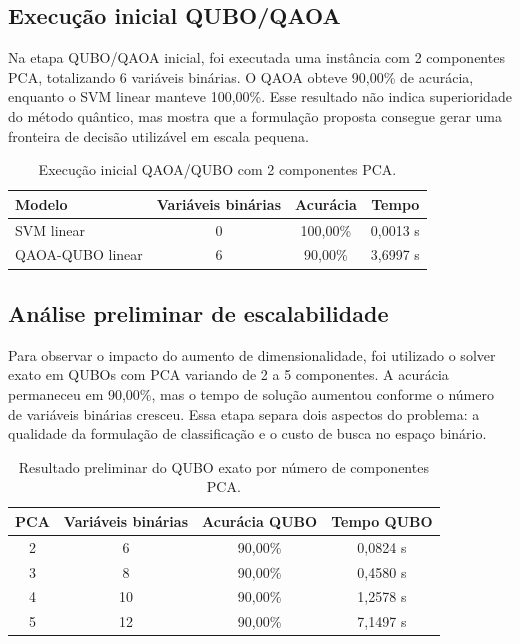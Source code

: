 \documentclass[12pt]{unisenaiclass}
\begin{document}
\subsection{Execução inicial QUBO/QAOA}

Na etapa QUBO/QAOA inicial, foi executada uma instância com 2 componentes PCA, totalizando 6 variáveis binárias. O QAOA obteve 90,00\% de acurácia, enquanto o SVM linear manteve 100,00\%. Esse resultado não indica superioridade do método quântico, mas mostra que a formulação proposta consegue gerar uma fronteira de decisão utilizável em escala pequena.

\begin{table}[H]
    \centering
    \caption{Execução inicial QAOA/QUBO com 2 componentes PCA.}
    \label{tab:qaoa-inicial}
    \begin{tabular}{lccc}
        \toprule
        Modelo & Variáveis binárias & Acurácia & Tempo \\
        \midrule
        SVM linear & 0 & 100,00\% & 0,0013 s \\
        QAOA-QUBO linear & 6 & 90,00\% & 3,6997 s \\
        \bottomrule
    \end{tabular}
\end{table}

\subsection{Análise preliminar de escalabilidade}

Para observar o impacto do aumento de dimensionalidade, foi utilizado o solver exato em QUBOs com PCA variando de 2 a 5 componentes. A acurácia permaneceu em 90,00\%, mas o tempo de solução aumentou conforme o número de variáveis binárias cresceu. Essa etapa separa dois aspectos do problema: a qualidade da formulação de classificação e o custo de busca no espaço binário.

\begin{table}[H]
    \centering
    \caption{Resultado preliminar do QUBO exato por número de componentes PCA.}
    \label{tab:qubo-exato}
    \begin{tabular}{cccc}
        \toprule
        PCA & Variáveis binárias & Acurácia QUBO & Tempo QUBO \\
        \midrule
        2 & 6  & 90,00\% & 0,0824 s \\
        3 & 8  & 90,00\% & 0,4580 s \\
        4 & 10 & 90,00\% & 1,2578 s \\
        5 & 12 & 90,00\% & 7,1497 s \\
        \bottomrule
    \end{tabular}
\end{table}
\end{document}
